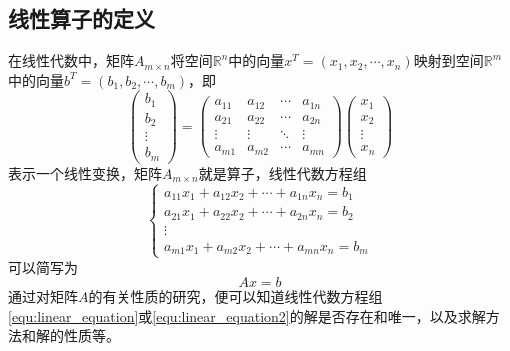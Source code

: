 \documentclass{suesreport}
\begin{document}
    \subsection{线性算子的定义}
    在线性代数中，矩阵$A_{m\times{n}}$将空间$\mathbb{R}^n$中的向量$x^{T}=\left(x_{1},x_{2},\cdots,x_{n}\right)$映射到空间$\mathbb{R}^m$中的向量$b^{T}=\left(b_{1},b_{2},\cdots,b_{m}\right)$，即
    \begin{equation}
        \left(\begin{array}{c}
            b_{1} \\
            b_{2} \\
            \vdots \\
            b_{m}
        \end{array}\right)=\left(\begin{array}{cccc}
            a_{11} & a_{12} & \cdots & a_{1 n} \\
            a_{21} & a_{22} & \cdots & a_{2 n} \\
            \vdots & \vdots & \ddots & \vdots \\
            a_{m 1} & a_{m 2} & \cdots & a_{m n}
        \end{array}\right)\left(\begin{array}{c}
            x_{1} \\
            x_{2} \\
            \vdots \\
            x_{n}
        \end{array}\right)
    \end{equation}
    表示一个线性变换，矩阵$A_{m\times{n}}$就是算子，线性代数方程组
    \begin{equation}
        \begin{cases}
            a_{11} x_{1}+a_{12} x_{2}+\cdots+a_{1 n} x_{n}=b_{1} \\
            a_{21} x_{1}+a_{22} x_{2}+\cdots+a_{2 n} x_{n}=b_{2} \\
            \vdots \\
            a_{m 1} x_{1}+a_{m 2} x_{2}+\cdots+a_{m n} x_{n}=b_{m}
        \end{cases}\label{equ:linear_equation}
    \end{equation}
    可以简写为
    \begin{equation}
        Ax=b\label{equ:linear_equation2}
    \end{equation}
    通过对矩阵$A$的有关性质的研究，便可以知道线性代数方程组\cref{equ:linear_equation}或\cref{equ:linear_equation2}的解是否存在和唯一，以及求解方法和解的性质等。
\end{document}
